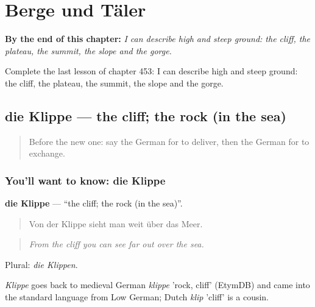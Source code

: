
\chapter{Berge und Täler}
\label{ch:ge-berge-und-taler}

\begin{chapteropening}
\textbf{By the end of this chapter:} \emph{I can describe high and steep ground: the cliff, the plateau, the summit, the slope and the gorge.}

Complete the last lesson of chapter 453: I can describe high and steep ground: the cliff, the plateau, the summit, the slope and the gorge.
\end{chapteropening}

\section[die Klippe]{die Klippe — the cliff; the rock (in the sea)}

\label{lesson:GE-C453-klippe}



\begin{quote}
Before the new one: say the German for to deliver, then the German for to exchange.
\end{quote}

\subsection*{You'll want to know: die Klippe}
\textbf{die Klippe} — \textquotedblleft{}the cliff; the rock (in the sea)\textquotedblright{}.

\begin{quote}
Von der Klippe sieht man weit über das Meer.
\end{quote}

\begin{quote}
\emph{From the cliff you can see far out over the sea.}
\end{quote}

Plural: \emph{die Klippen}.

\begin{cousinweb}
\emph{Klippe} goes back to medieval German \emph{klippe} 'rock, cliff' (EtymDB) and came into the standard language from Low German; Dutch \emph{klip} 'cliff' is a cousin.
\end{cousinweb}

